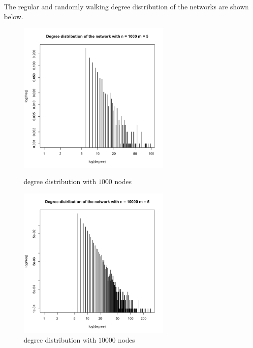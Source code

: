 \documentclass[draftcls,12pt,onecolumn]{IEEEtran}
\begin{document}
The regular and randomly walking degree distribution of the networks are shown below.
\begin{figure}[htbp]
\centering
\begin{minipage}[t]{0.48\textwidth}
\centering
\includegraphics[width=7.5cm]{img/2_g_2_degree1}
\caption{degree distribution with $1000$ nodes}
\end{minipage}
\begin{minipage}[t]{0.48\textwidth}
\centering
\includegraphics[width=7.5cm]{img/2_g_2_degree2}
\caption{degree distribution with $10000$ nodes}
\end{minipage}
\end{figure}
\end{document}
